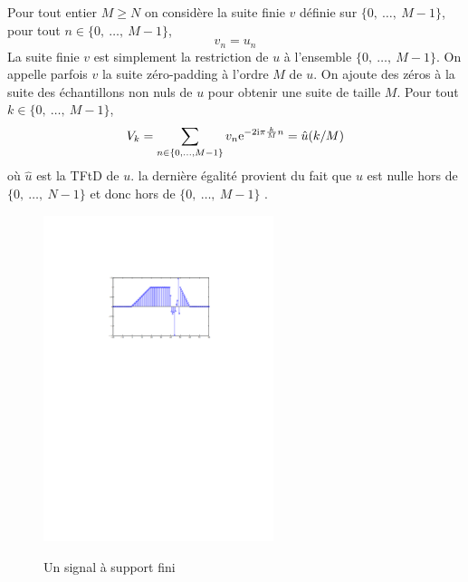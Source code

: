 Pour tout entier $M\geq N$ on consid\`{e}re la suite finie $v$ d\'{e}finie sur $\{0,\ \ldots,\ M-1\}$, pour tout $n\in\{0,\ \ldots,\ M-1\}$,
$$
v_{n}=u_{n}
$$
La suite finie $v$ est simplement la restriction de $u$ \`{a} l'ensemble $\{0,\ \ldots,\ M-1\}$. On appelle parfois $v$ la suite z\'{e}ro-padding \`{a} l'ordre $M$ de $u$. On ajoute des z\'{e}ros \`{a} la suite des \'{e}chantillons non nuls de $u$ pour obtenir une suite de taille $M$. Pour tout $k\in\{0,\ \ldots,\ M-1\}$,
$$
V_k=\sum_{n\in\{0,\ldots,M-1\}}v_{n}\mathrm{e}^{-2\mathrm{i}\pi \frac{k}{M}n}=\hat{u}(k/M)
$$
o\`{u} $\hat{u}$ est la TFtD de $u$. la derni\`{e}re \'{e}galit\'{e} provient du fait que $u$ est nulle hors de $\{0,\ \ldots,\ N-1\}$ et donc hors de $\{0,\ \ldots,\ M-1\}$ .



\begin{figure}
  \centering
  \includegraphics[width=0.6\textwidth]{Figures/Figure2-1}\\
  \caption{Un signal  \`a support fini}\label{fig:figure2-1}
\end{figure}

